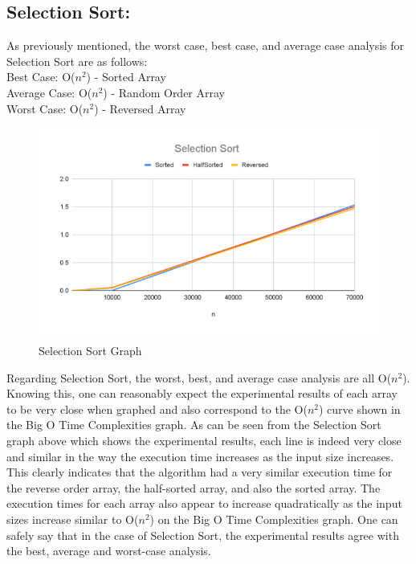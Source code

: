\documentclass[12pt]{article}
\begin{document}
	\subsection{Selection Sort:}

	As previously mentioned, the worst case, best case, and average case analysis for Selection Sort are as follows: \\

	\indent	Best Case: O($n^2$) - Sorted Array\\
	\indent	Average Case: O($n^2$) - Random Order Array\\
	\indent	Worst Case: O($n^2$) - Reversed Array\\
	
\begin{figure}[h]
	\centering
	\includegraphics[width=\textwidth]{Selection Graph.PNG}
\caption{Selection Sort Graph}
    \label{fig:mesh1}
\end{figure}

	Regarding Selection Sort, the worst, best, and average case analysis are all O($n^2$). Knowing this, one can reasonably expect the experimental results of each array to be very close when graphed and also correspond to the O($n^2$) curve shown in the Big O Time Complexities graph. As can be seen from the Selection Sort graph above which shows the experimental results, each line is indeed very close and similar in the way the execution time increases as the input size increases. This clearly indicates that the algorithm had a very similar execution time for the reverse order array, the half-sorted array, and also the sorted array. The execution times for each array also appear to increase quadratically as the input sizes increase similar to O($n^2$) on the Big O Time Complexities graph. One can safely say that in the case of Selection Sort, the experimental results agree with the best, average and worst-case analysis.\\
	
\end{document}
